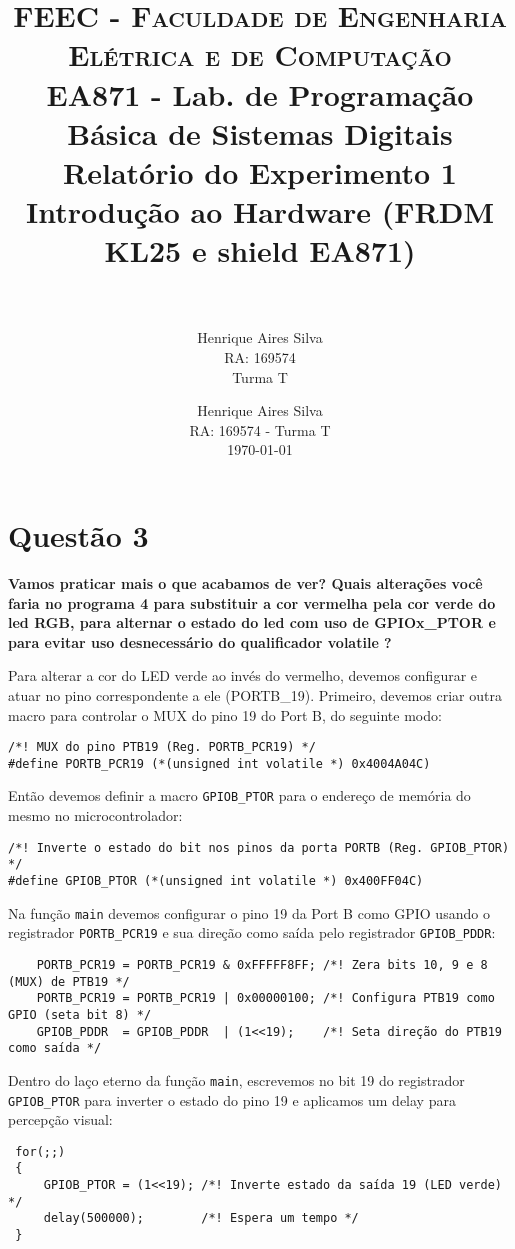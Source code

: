 \documentclass[paper=a4, fontsize=11pt]{scrartcl}
\author{Henrique Aires Silva \\RA: 169574 \\ Turma T}
\title{
  \usefont{OT1}{bch}{b}{n}
  \normalfont \normalsize \textsc{FEEC - Faculdade de Engenharia Elétrica e de Computação} \\
  \normalfont \normalsize EA871 - Lab. de Programação Básica de Sistemas Digitais
  \horrule{0.5pt} \\[0.1cm]
  \LARGE Relatório do Experimento 1\\Introdução ao Hardware (FRDM KL25 e shield EA871) \\
  \horrule{2pt} \\[0.5cm]
}
\author{
  \normalfont 								\normalsize
  Henrique Aires Silva\\ \normalfont \normalsize RA: 169574 - Turma T\\[-3pt]		\normalsize
  \today
}
\date{}
\begin{document}
\maketitle

\section*{Questão 3}
\textbf{Vamos praticar mais o que acabamos de ver? Quais alterações você faria no programa 4 para substituir a cor vermelha pela cor verde do led RGB, para alternar o estado do led com uso de GPIOx\_PTOR e para evitar uso desnecessário do qualificador volatile ?}

Para alterar a cor do LED verde ao invés do vermelho, devemos configurar e atuar no pino correspondente a ele (PORTB\_19).
Primeiro, devemos criar outra macro para controlar o MUX do pino 19 do Port B, do seguinte modo:

\begin{verbatim}
/*! MUX do pino PTB19 (Reg. PORTB_PCR19) */
#define PORTB_PCR19 (*(unsigned int volatile *) 0x4004A04C)
\end{verbatim}

Então devemos definir a macro \texttt{GPIOB\_PTOR} para o endereço de memória do mesmo no microcontrolador:
\begin{verbatim}
/*! Inverte o estado do bit nos pinos da porta PORTB (Reg. GPIOB_PTOR) */
#define GPIOB_PTOR (*(unsigned int volatile *) 0x400FF04C)
\end{verbatim}

Na função \texttt{main} devemos configurar o pino 19 da Port B como GPIO usando o registrador \texttt{PORTB\_PCR19} e sua direção como saída pelo registrador \texttt{GPIOB\_PDDR}:
\begin{verbatim}
	PORTB_PCR19 = PORTB_PCR19 & 0xFFFFF8FF; /*! Zera bits 10, 9 e 8 (MUX) de PTB19 */
	PORTB_PCR19 = PORTB_PCR19 | 0x00000100; /*! Configura PTB19 como GPIO (seta bit 8) */
	GPIOB_PDDR  = GPIOB_PDDR  | (1<<19);    /*! Seta direção do PTB19 como saída */
\end{verbatim}

Dentro do laço eterno da função \texttt{main}, escrevemos no bit 19 do registrador \texttt{GPIOB\_PTOR} para inverter o estado do pino 19 e aplicamos um delay para percepção visual:
\begin{verbatim}
 for(;;)
 {
     GPIOB_PTOR = (1<<19); /*! Inverte estado da saída 19 (LED verde) */
     delay(500000);        /*! Espera um tempo */
 }
\end{verbatim}
\end{document}
